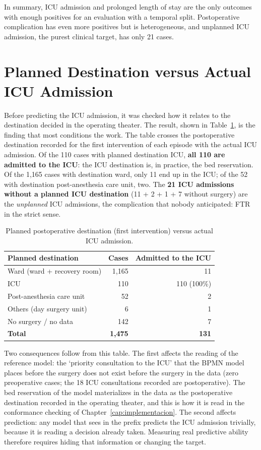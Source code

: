 In summary, ICU admission and prolonged length of stay are the only outcomes with enough positives for an evaluation with a temporal split. Postoperative complication has even more positives but is heterogeneous, and unplanned ICU admission, the purest clinical target, has only 21 cases.

\section{Planned Destination versus Actual ICU Admission}
\label{sec:destino_uci}

Before predicting the ICU admission, it was checked how it relates to the destination decided in the operating theater. The result, shown in Table~\ref{tab:destino_uci}, is the finding that most conditions the work. The table crosses the postoperative destination recorded for the first intervention of each episode with the actual ICU admission. Of the 110 cases with planned destination ICU, \textbf{all 110 are admitted to the ICU}: the ICU destination is, in practice, the bed reservation. Of the 1,165 cases with destination ward, only 11 end up in the ICU; of the 52 with destination post-anesthesia care unit, two. The \textbf{21 ICU admissions without a planned ICU destination} (11 + 2 + 1 + 7 without surgery) are the \emph{unplanned} ICU admissions, the complication that nobody anticipated: FTR in the strict sense.

\begin{table}[htbp]
\centering
\caption{Planned postoperative destination (first intervention) versus actual ICU admission.}
\label{tab:destino_uci}
\begin{tabular}{lrr}
\toprule
Planned destination & Cases & Admitted to the ICU \\
\midrule
Ward (ward + recovery room) & 1,165 & 11 \\
ICU & 110 & 110 (100\%) \\
Post-anesthesia care unit & 52 & 2 \\
Others (day surgery unit) & 6 & 1 \\
No surgery / no data & 142 & 7 \\
\midrule
\textbf{Total} & \textbf{1,475} & \textbf{131} \\
\bottomrule
\end{tabular}
\end{table}

Two consequences follow from this table. The first affects the reading of the reference model: the `priority consultation to the ICU' that the BPMN model places before the surgery does not exist before the surgery in the data (zero preoperative cases; the 18 ICU consultations recorded are postoperative). The bed reservation of the model materializes in the data as the postoperative destination recorded in the operating theater, and this is how it is read in the conformance checking of Chapter~\ref{cap:implementacion}. The second affects prediction: any model that sees  in the prefix predicts the ICU admission trivially, because it is reading a decision already taken. Measuring real predictive ability therefore requires hiding that information or changing the target.

